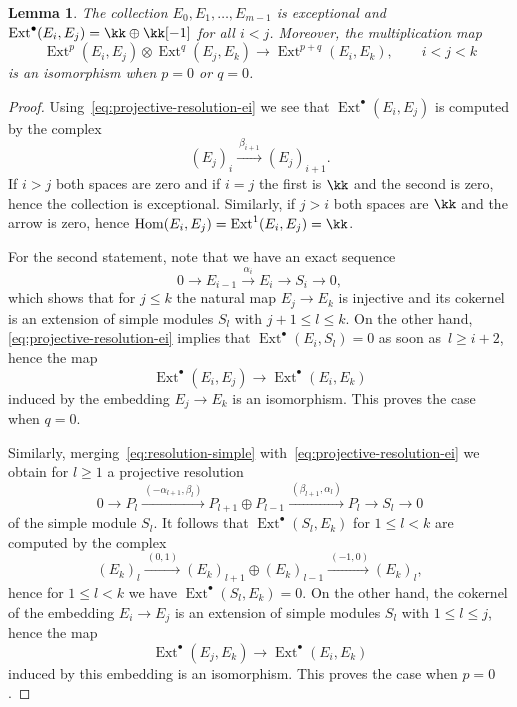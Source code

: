 \documentclass[11pt]{amsart}
\DeclareMathOperator{\Hom}{\mathrm{Hom}}
\DeclareMathOperator{\Ext}{\mathrm{Ext}}
\theoremstyle{plain}
\newtheorem{lemma}[theorem]{Lemma}
\theoremstyle{definition}
\theoremstyle{remark}
\begin{document}
\begin{lemma}
\label{lemma:auslander-ext-ei}
The collection $E_0,E_1,\dots,E_{m-1}$ is exceptional and $\Ext^\bullet(E_i,E_j) = \kk \oplus \kk[-1]$ for all $i < j$.
Moreover, the multiplication map
\begin{equation*}
\Ext^p(E_i,E_j) \otimes \Ext^q(E_j,E_k) \to \Ext^{p+q}(E_i,E_k),
\qquad i < j < k
\end{equation*}
is an isomorphism when $p = 0$ or $q = 0$.
\end{lemma}
\begin{proof}
Using~\eqref{eq:projective-resolution-ei} we see that $\Ext^\bullet(E_i,E_j)$ is computed by the complex
\begin{equation*}
(E_j)_i \xrightarrow{\ \beta_{i+1}\ } (E_j)_{i+1}.
\end{equation*}
If $i > j$ both spaces are zero and if $i = j$ the first is $\kk$ and the second is zero, hence the collection is exceptional.
Similarly, if $j > i$ both spaces are $\kk$ and the arrow is zero, hence $\Hom(E_i,E_j) = \Ext^1(E_i,E_j) = \kk$.

For the second statement, note that we have an exact sequence
\begin{equation}\label{eq:resolution-simple}
0 \to E_{i-1} \xrightarrow{\ \alpha_i\ } E_i \to S_i \to 0,
\end{equation} 
which shows that for $j \le k$ the natural map $E_j \to E_k$ is injective and its cokernel is an extension of simple modules $S_l$ with $j+1 \le l \le k$.
On the other hand, \eqref{eq:projective-resolution-ei} implies that $\Ext^\bullet(E_i,S_l) = 0$ as soon as~$l \ge i+2$, hence the map 
\begin{equation*}
\Ext^\bullet(E_i,E_j) \to \Ext^\bullet(E_i,E_k)
\end{equation*}
induced by the embedding $E_j \to E_k$ is an isomorphism. This proves the case when $q = 0$.

Similarly, merging~\eqref{eq:resolution-simple} with~\eqref{eq:projective-resolution-ei} we obtain for $l \ge 1$ a projective resolution
\begin{equation}\label{eq:projective-resolution-simples}
0 \to P_l \xrightarrow{\ (-\alpha_{l+1},\beta_l)\ } P_{l+1} \oplus P_{l-1} \xrightarrow{\ (\beta_{l+1},\alpha_l)\ } P_l \to S_l \to  0
\end{equation}
of the simple module $S_l$.
It follows that $\Ext^\bullet(S_l,E_k)$ for $1 \le l < k$ are computed by the complex
\begin{equation*}
(E_k)_l \xrightarrow{\ (0,1)\ } (E_k)_{l+1} \oplus (E_k)_{l-1} \xrightarrow{\ (-1,0)} (E_k)_l,
\end{equation*}
hence for $1 \le l < k$ we have $\Ext^\bullet(S_l,E_k) = 0$.
On the other hand, the cokernel of the embedding $E_i \to E_j$ is an extension of simple modules $S_l$ with $1 \le l \le j$, hence the map 
\begin{equation*}
\Ext^\bullet(E_j,E_k) \to \Ext^\bullet(E_i,E_k)
\end{equation*}
induced by this embedding is an isomorphism. This proves the case when $p = 0$.
\end{proof}
\end{document}
